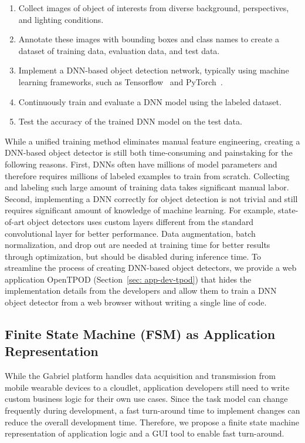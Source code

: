 \begin{enumerate}
  \item Collect images of object of interests from diverse background,
  perspectives, and lighting conditions.
  \item Annotate these images with bounding boxes and class names to create a
  dataset of training data, evaluation data, and test data.
  \item Implement a DNN-based object detection network, typically using machine learning frameworks,
  such as Tensorflow~\cite{abadi2016tensorflow} and
  PyTorch~\cite{paszke2019pytorch}.
  \item Continuously train and evaluate a DNN model using the labeled dataset.
  \item Test the accuracy of the trained DNN model on the test data.
\end{enumerate}

While a unified training method eliminates manual feature engineering, creating
a DNN-based object detector is still both time-consuming and painstaking for the
following reasons. First, DNNs often have millions of model parameters and
therefore requires millions of labeled examples to train from scratch.
Collecting and labeling such large amount of training data takes significant
manual labor. Second, implementing a DNN correctly for object detection is not
trivial and still requires significant amount of knowledge of machine learning.
For example, state-of-art object detectors uses custom layers different from the
standard convolutional layer for better performance. Data augmentation, batch
normalization, and drop out are needed at training time for better results
through optimization, but should be disabled during inference time. To
streamline the process of creating DNN-based object detectors, we provide a web
application OpenTPOD (Section~\ref{sec: app-dev-tpod}) that hides the implementation
details from the developers and allow them to train a DNN object detector from a
web browser without writing a single line of code.

\subsection{Finite State Machine (FSM) as Application Representation}
\label{sec: app-dev-fsm-representation}

While the Gabriel platform handles data acquisition and transmission from mobile
wearable devices to a cloudlet, application developers still need to write
custom business logic for their own use cases. Since the task model can change
frequently during development, a fast turn-around time to implement changes can
reduce the overall development time. Therefore, we propose a finite state
machine representation of application logic and a GUI tool to enable fast
turn-around. 

